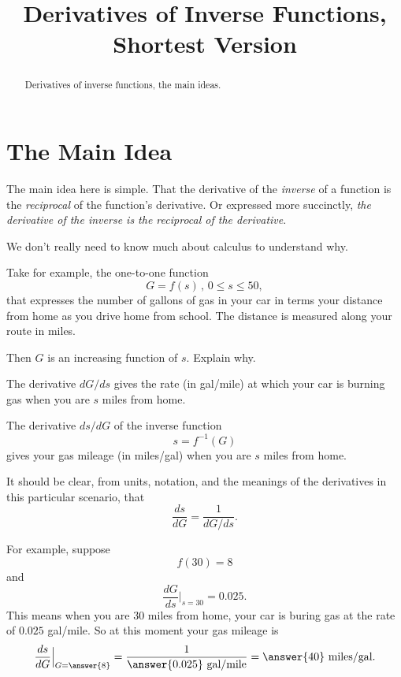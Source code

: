 \documentclass{ximera}
\title{Derivatives of Inverse Functions, Shortest Version}
\begin{document}
\begin{abstract}
Derivatives of inverse functions, the main ideas.
\end{abstract}
\maketitle

\section{The Main Idea}

The main idea here is simple. That the derivative of the \emph{inverse} of a function is the \emph{reciprocal} of the function's derivative. Or expressed more succinctly, \emph{the derivative of the inverse is the reciprocal of the derivative}.

We don't really need to know much about calculus to understand why. 

\begin{question} \label{Qdfer99rf}
Take for example, the one-to-one function
\[
   G =f(s) \, , \, 0\leq s \leq 50 ,
\]
that expresses the number of gallons of gas in your car in terms your distance from home as you drive home from school. The distance is measured  along your route in miles.

Then $G$ is an increasing function of $s$. Explain why.
\begin{freeResponse}
\end{freeResponse}

The derivative $dG/ds$ gives the rate (in gal/mile) at which your car is burning gas when  you are $s$ miles from home.

The derivative $ds/dG$ of the inverse function
\[
    s = f^{-1}(G)
\]
gives your gas mileage (in miles/gal)  when you are $s$ miles from home.

It should be clear, from units, notation, and the meanings of the derivatives in this particular scenario, that
\[
 \frac{ds}{dG} = \frac{1}{dG/ds} .
\]

For example, suppose 
\[
   f(30) = 8
\]
and
\[
     \frac{dG}{ds}\Big|_{s=30} = 0.025 .
\]
This means when you are $30$ miles from home, your car is buring gas at the rate of $0.025$ gal/mile. So at this moment your gas mileage is
\[
     \frac{ds}{dG}\Big|_{G=\answer{8}} =   \frac{1}{\answer{0.025} \text{ gal/mile}} = \answer{40} \text{ miles/gal}.
\]

\end{question}
\end{document}
